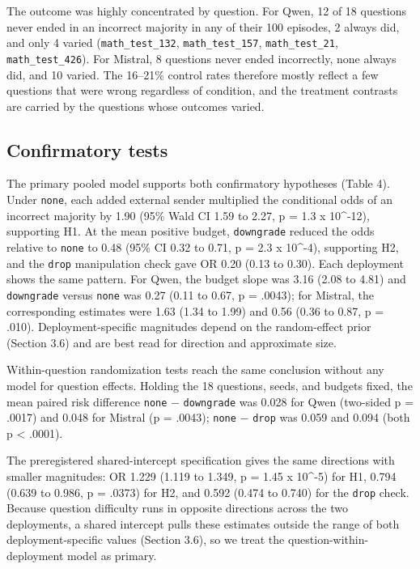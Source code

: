 \documentclass[11pt]{article}
\begin{document}
The outcome was highly concentrated by question. For Qwen, 12 of 18 questions never ended in an incorrect majority in any of their 100 episodes, 2 always did, and only 4 varied (\texttt{math\_test\_132}, \texttt{math\_test\_157}, \texttt{math\_test\_21}, \texttt{math\_test\_426}). For Mistral, 8 questions never ended incorrectly, none always did, and 10 varied. The 16–21\% control rates therefore mostly reflect a few questions that were wrong regardless of condition, and the treatment contrasts are carried by the questions whose outcomes varied.

\subsection{Confirmatory tests}

The primary pooled model supports both confirmatory hypotheses (Table 4). Under \texttt{none}, each added external sender multiplied the conditional odds of an incorrect majority by 1.90 (95\% Wald CI 1.59 to 2.27, p = 1.3 x 10\textasciicircum{}-12), supporting H1. At the mean positive budget, \texttt{downgrade} reduced the odds relative to \texttt{none} to 0.48 (95\% CI 0.32 to 0.71, p = 2.3 x 10\textasciicircum{}-4), supporting H2, and the \texttt{drop} manipulation check gave OR 0.20 (0.13 to 0.30). Each deployment shows the same pattern. For Qwen, the budget slope was 3.16 (2.08 to 4.81) and \texttt{downgrade} versus \texttt{none} was 0.27 (0.11 to 0.67, p = .0043); for Mistral, the corresponding estimates were 1.63 (1.34 to 1.99) and 0.56 (0.36 to 0.87, p = .010). Deployment-specific magnitudes depend on the random-effect prior (Section 3.6) and are best read for direction and approximate size.

Within-question randomization tests reach the same conclusion without any model for question effects. Holding the 18 questions, seeds, and budgets fixed, the mean paired risk difference \texttt{none} − \texttt{downgrade} was 0.028 for Qwen (two-sided p = .0017) and 0.048 for Mistral (p = .0043); \texttt{none} − \texttt{drop} was 0.059 and 0.094 (both p < .0001).

The preregistered shared-intercept specification gives the same directions with smaller magnitudes: OR 1.229 (1.119 to 1.349, p = 1.45 x 10\textasciicircum{}-5) for H1, 0.794 (0.639 to 0.986, p = .0373) for H2, and 0.592 (0.474 to 0.740) for the \texttt{drop} check. Because question difficulty runs in opposite directions across the two deployments, a shared intercept pulls these estimates outside the range of both deployment-specific values (Section 3.6), so we treat the question-within-deployment model as primary.
\end{document}
